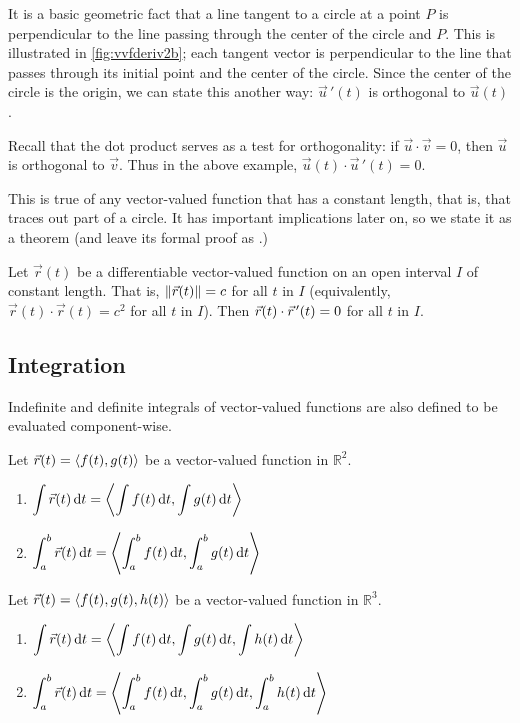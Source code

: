 \vspace{-\topsep}\vspace{-\partopsep}

It is a basic geometric fact that a line tangent to a circle at a point $P$ is perpendicular to the line passing through the center of the circle and $P$. This is illustrated in \autoref{fig:vvfderiv2b}; each tangent vector is perpendicular to the line that passes through its initial point and the center of the circle. Since the center of the circle is the origin, we can state this another way: $\vec u\,'(t)$ is orthogonal to $\vec u(t)$.

Recall that the dot product serves as a test for orthogonality: if $\vec u\cdot \vec v = 0$, then $\vec u$ is orthogonal to $\vec v$. Thus in the above example, $\vec u(t)\cdot \vec u\,'(t)=0$.

This is true of any vector-valued function that has a constant length, that is, that traces out part of a circle. It has important implications later on, so we state it as a theorem (and leave its formal proof as .)

\begin{theorem}\label{thm:vects_of_constant_length}%
Let $\vec r(t)$ be a differentiable vector-valued function on an open interval $I$ of constant length. That is, $\left\lVert \vec r(t) \right\rVert = c$ for all $t$ in $I$ (equivalently, $\vec r(t)\cdot \vec r(t) = c^2$ for all $t$ in $I$). 
Then $\vec r(t)\cdot\vec r\hskip1.25pt '(t) = 0$ for all $t$ in $I$.
\end{theorem}

\subsection{Integration}

Indefinite and definite integrals of vector-valued functions are also defined to be evaluated component-wise.

\begin{definition}\label{thm:vvf_integration}%
Let $\vec r(t) =\left\langle f(t),g(t)\right\rangle$ be a vector-valued function in $\mathbb{R}^2$.
\begin{enumerate}
	\item $\displaystyle \int \vec r(t)\operatorname{d}\! t =\left\langle \int f(t)\operatorname{d}\! t, \int g(t)\operatorname{d}\! t\right\rangle$
	\item	$\displaystyle \int_a^b \vec r(t)\operatorname{d}\! t =\left\langle \int_a^b f(t)\operatorname{d}\! t, \int_a^b g(t)\operatorname{d}\! t\right\rangle$
\end{enumerate}
Let $\vec r(t) =\left\langle f(t),g(t),h(t)\right\rangle$ be a vector-valued function in $\mathbb{R}^3$.
\begin{enumerate}
	\item $\displaystyle \int \vec r(t)\operatorname{d}\! t =\left\langle \int f(t)\operatorname{d}\! t, \int g(t)\operatorname{d}\! t, \int h(t)\operatorname{d}\! t\right\rangle$
	\item	$\displaystyle \int_a^b \vec r(t)\operatorname{d}\! t =\left\langle \int_a^b f(t)\operatorname{d}\! t, \int_a^b g(t)\operatorname{d}\! t, \int_a^b h(t)\operatorname{d}\! t\right\rangle$
\end{enumerate}
\end{definition}


